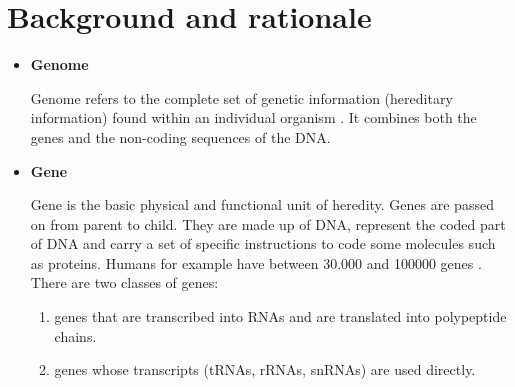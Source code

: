 \documentclass[10pt,twocolumn,letterpaper]{article}
\begin{document}
\section{Background and rationale}
 {
   \begin{itemize}
      \item \textbf{Genome}
      \par Genome refers to the complete set of genetic information (hereditary information) found within an individual organism \cite{krawetz2003introduction}.
        It combines   both the genes and the non-coding sequences of the DNA.

      \item \textbf{Gene} 
      \par Gene is the basic physical and functional unit of heredity. Genes are passed on from parent to child. They     are made up of DNA, represent the coded part of DNA and carry a set of specific instructions to code some molecules such as proteins. Humans for example have between 30.000 and 100000 genes \cite{krawetz2003introduction}. There are two classes of genes:
      \begin{enumerate}
          \item genes that are transcribed into RNAs and are translated into polypeptide chains.
          \item genes whose transcripts (tRNAs, rRNAs, snRNAs) are used directly.
      \end{enumerate}


\end{itemize}}
\end{document}
